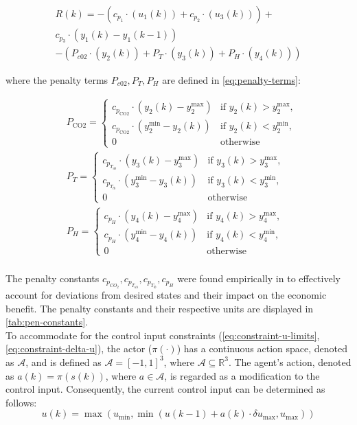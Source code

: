 \begin{multline}\label{eq:reward_fn}
	R(k)  =  - (c_{p_1} \cdot (u_1(k)) + c_{p_2} \cdot (u_3(k))) + \\ c_{p_3} \cdot (y_1(k)- y_1(k-1)) \\
	- (P_{c02} \cdot (y_2(k) ) + P_T \cdot (y_3(k)) + P_H \cdot (y_4(k)) )
\end{multline}

where the penalty terms $P_{c02},P_T,P_H$ are defined in \autoref{eq:penalty-terms}:

\begin{equation}\label{eq:penalty-terms}
	\begin{aligned}
		& P_{\text{CO2}} = 
		\begin{cases} 
			c_{p_{\text{CO2}}} \cdot (y_2(k) - y_2^{\text{max}}) & \text{if } y_2(k) > y_2^{\text{max}} , \\
			c_{p_{\text{CO2}}} \cdot (y_2^{\text{min}} - y_2(k)) & \text{if } y_2(k) < y_2^{\text{min}} , \\
			0 & \text{otherwise}
		\end{cases}
		\\
		& P_{T} = 
		\begin{cases} 
			c_{p_{T_{ub}}} \cdot (y_3(k) - y_3^{\text{max}}) & \text{if } y_3(k) > y_3^{\text{max}} , \\
			c_{p_{T_{lb}}} \cdot (y_3^{\text{min}} - y_3(k)) & \text{if } y_3(k) < y_3^{\text{min}} , \\
			0 & \text{otherwise}
		\end{cases}
		\\
		& P_{H} = 
		\begin{cases} 
			c_{p_{H}} \cdot (y_4(k) - y_4^{\text{max}}) & \text{if } y_4(k) > y_4^{\text{max}} , \\
			c_{p_{H}} \cdot (y_4^{\text{min}} - y_4(k)) & \text{if } y_4(k) < y_4^{\text{min}} , \\
			0 & \text{otherwise}
		\end{cases}
		\\
	\end{aligned}
\end{equation}

The penalty constants $c_{p_{CO_2}}, c_{p_{T_{ub}}},c_{p_{T_{lb}}},c_{p_{H}}$ were found empirically in \citet{jansenOptimalControlLettuce2023} to effectively account for deviations from desired states and their impact on the economic benefit. The penalty constants and their respective units are displayed in \autoref{tab:pen-constants}.\\
To accommodate for the control input constraints (\autoref{eq:constraint-u-limits}, \autoref{eq:constraint-delta-u}), the actor ($\pi(\cdot)$) has a continuous action space, denoted as \( \mathcal{A} \),  and is defined as \( \mathcal{A} = [-1, 1]^3 \), where \( \mathcal{A} \subseteq \mathbb{R}^3 \). The agent’s action, denoted as  $a(k) = \pi (s(k))$, where $a \in \mathcal{A}$, is regarded as a modification to the control input. Consequently, the current control input can be determined as follows:
$$
u(k) = \max(u_{\min}, \min(u(k-1) + a(k) \cdot \delta u_{\max}, u_{\max}))
$$


